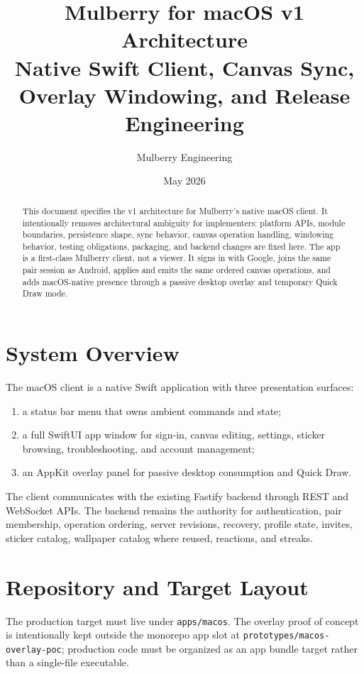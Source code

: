 \documentclass[11pt]{article}
\title{\textbf{Mulberry for macOS v1 Architecture}\\
\large Native Swift Client, Canvas Sync, Overlay Windowing, and Release Engineering}
\author{Mulberry Engineering}
\date{May 2026}
\begin{document}
\maketitle

\begin{abstract}
This document specifies the v1 architecture for Mulberry's native macOS client. It intentionally removes architectural ambiguity for implementers: platform APIs, module boundaries, persistence shape, sync behavior, canvas operation handling, windowing behavior, testing obligations, packaging, and backend changes are fixed here. The app is a first-class Mulberry client, not a viewer. It signs in with Google, joins the same pair session as Android, applies and emits the same ordered canvas operations, and adds macOS-native presence through a passive desktop overlay and temporary Quick Draw mode.
\end{abstract}

\section{System Overview}

The macOS client is a native Swift application with three presentation surfaces:
\begin{enumerate}
  \item a status bar menu that owns ambient commands and state;
  \item a full SwiftUI app window for sign-in, canvas editing, settings, sticker browsing, troubleshooting, and account management;
  \item an AppKit overlay panel for passive desktop consumption and Quick Draw.
\end{enumerate}

The client communicates with the existing Fastify backend through REST and WebSocket APIs. The backend remains the authority for authentication, pair membership, operation ordering, server revisions, recovery, profile state, invites, sticker catalog, wallpaper catalog where reused, reactions, and streaks.

\section{Repository and Target Layout}

The production target must live under \texttt{apps/macos}. The overlay proof of concept is intentionally kept outside the monorepo app slot at \texttt{prototypes/macos-overlay-poc}; production code must be organized as an app bundle target rather than a single-file executable.
\end{document}
